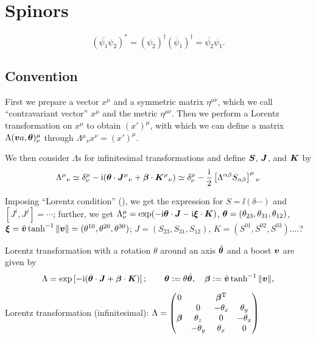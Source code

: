 \documentclass[CheatSheet]{subfiles}
\begin{document}
\changefontsizes{10pt}
\section{Spinors}

\changefontsizes{9pt}
\begin{equation}
 (\overline{\psi_1}\psi_2)^* = (\psi_2)^\dagger(\overline\psi_1)^\dagger = \overline{\psi_2}\psi_1.
\end{equation}


\subsection[Convention]{Convention }
First we prepare a vector $x^\mu$ and a symmetric matrix $\eta^{\mu\nu}$, which we call ``contravariant vector'' $x^\mu$ and the metric $\eta^{\mu\nu}$.
Then we perform a Lorentz transformation on $x^\mu$ to obtain $(x')^\mu$, with which we can define a matrix $\Lambda({\boldsymbol{v}}a,{\boldsymbol{\theta}})^{\mu}_{\nu}$ through 
$\Lambda{}^\mu{}_\nu x^{\nu}=(x')^{\mu}$.

We then consider $\Lambda$s for infinitesimal transformations and define ${\boldsymbol{S}}$, ${\boldsymbol{J}}$, and ${\boldsymbol{K}}$ by
\begin{align}
 \Lambda^\mu{}_\nu
  \simeq \delta^\mu_\nu-\mathrm{i}({\boldsymbol{\theta}}\cdot{\boldsymbol{J}}^\mu{}_\nu+{\boldsymbol{\beta}}\cdot{\boldsymbol{K}}^\mu{}_\nu)
  \simeq \delta^\mu_\nu-\frac{\mathrm{i}}{2}  \left[\Lambda^{\alpha\beta}S_{\alpha\beta}\right]^\mu{}_\nu
\end{align}

Imposing ``Lorentz condition'' (), we get the expression for $S=\ii(\delta\cdots)$ and $[J^i,J^j]=\cdots$; further, we get $\Lambda^{\mu}_{\nu}=\exp(-\mathrm{i}{\boldsymbol{\theta}}\cdot{\boldsymbol{J}} -\mathrm{i} {\boldsymbol{\xi}}\cdot{\boldsymbol{K}})$, ${\boldsymbol{\theta}}=(\theta_{23},\theta_{31}, \theta_{12})$, ${\boldsymbol{\xi}} = \hat{{\boldsymbol{v}}}\tanh^{-1}\|{\boldsymbol{v}}\|=(\theta^{10},\theta^{20},\theta^{30})$; $J=(S_{23},S_{31},S_{12})$, $K=(S^{01}, S^{02}, S^{03})$....?




Lorentz transformation with a rotation $\theta$ around an axis $\hat{{\boldsymbol{\theta}}}$ and a boost ${\boldsymbol{v}}$ are given by
\begin{equation}
 \Lambda = \exp\left[-\mathrm{i}({\boldsymbol{\theta}}\cdot{\boldsymbol{J}}+{\boldsymbol{\beta}}\cdot {\boldsymbol{K}})\right];
\qquad
{\boldsymbol{\theta}}:=\theta\hat{{\boldsymbol{\theta}}}, \quad {\boldsymbol{\beta}} := \hat{{\boldsymbol{v}}}\tanh^{-1}\|{\boldsymbol{v}}\|,
\end{equation}


Lorentz transformation (infinitesimal):
$\Lambda=\begin{pmatrix}
  0 &   & {\boldsymbol{\beta}}^{\mathrm{T}} & \\
    & 0 &-\theta_z & \theta_y\\
  {\boldsymbol{\beta}} & \theta_z & 0 & -\theta_x \\
   & -\theta_y & \theta_x & 0
\end{pmatrix}$
\end{document}
